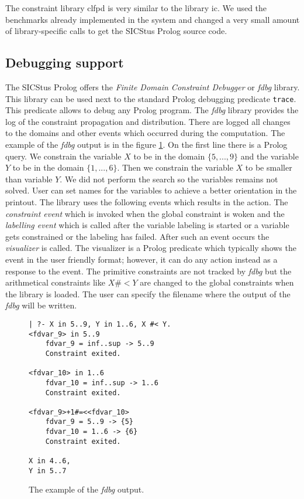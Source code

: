 The constraint library clfpd is very similar to the \eclipse library ic. We used the 
benchmarks already implemented in the \eclipse system and changed a very small amount
of library-specific calls to get the SICStus Prolog source code.

\subsection{Debugging support}
The SICStus Prolog offers the {\em Finite Domain Constraint Debugger} or {\em fdbg} library.
This library can be used next to the standard Prolog debugging predicate \texttt{trace}. This
predicate allows to debug any Prolog program. The {\em fdbg} library provides the
log of the constraint propagation and distribution. There are logged all changes to the
domains and other events which occurred during the computation. The example of the {\em fdbg}
output is in the figure \ref{sicstus:fdbg}. On the first line there is a Prolog query.
We constrain the variable $X$ to be in the domain $\{5,...,9\}$ and the variable $Y$
to be in the domain $\{1,...,6\}$. Then we constrain the variable $X$ to be smaller than
variable $Y$. We did not perform the search so the variables remains not solved.
User can set names for the variables to achieve a better orientation in the printout.
The library uses the following events which results in the action. The {\em constraint 
event} which is invoked when the global constraint is woken and the {\em labelling event}
which is called after the variable labeling is started or a variable gets constrained
or the labeling has failed. After such an event occurs the {\em visualizer} is called. 
The visualizer is a Prolog predicate which typically shows the event in the user 
friendly format; however, it can do any action instead as a response to the event.
The primitive constraints are not tracked by {\em fdbg} but the arithmetical constraints
like $X \#< Y$ are changed to the global constraints when the library is loaded.
The user can specify the filename where the output of the {\em fdbg} will be written.

\begin{figure}
\caption{\label{sicstus:fdbg}The example of the {\em fdbg} output.}
\begin{verbatim}
| ?- X in 5..9, Y in 1..6, X #< Y.
<fdvar_9> in 5..9
    fdvar_9 = inf..sup -> 5..9
    Constraint exited.

<fdvar_10> in 1..6
    fdvar_10 = inf..sup -> 1..6
    Constraint exited.

<fdvar_9>+1#=<<fdvar_10>
    fdvar_9 = 5..9 -> {5}
    fdvar_10 = 1..6 -> {6}
    Constraint exited.
    
X in 4..6,
Y in 5..7 
\end{verbatim}   
\end{figure}

